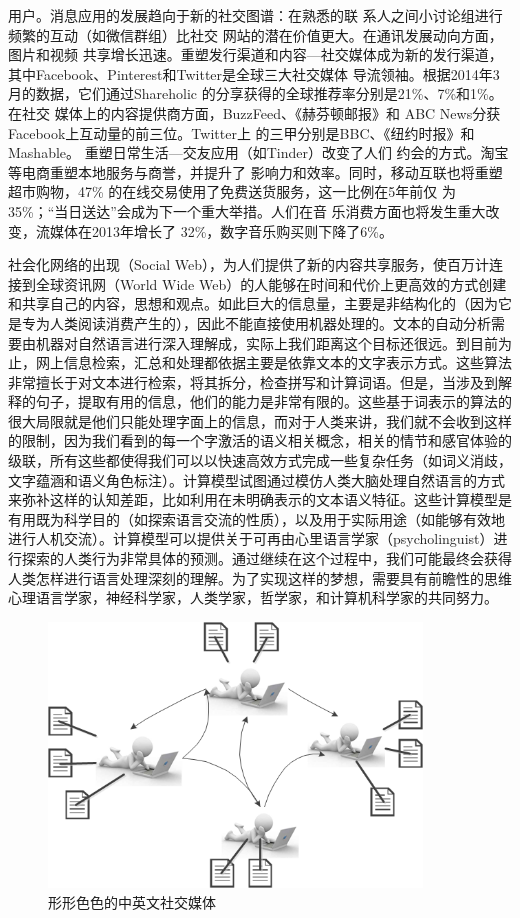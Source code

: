 用户。消息应用的发展趋向于新的社交图谱：在熟悉的联 系人之间小讨论组进行频繁的互动（如微信群组）比社交 网站的潜在价值更大。在通讯发展动向方面，图片和视频 共享增长迅速。重塑发行渠道和内容—社交媒体成为新的发行渠道，
其中Facebook、Pinterest和Twitter是全球三大社交媒体 导流领袖。根据2014年3月的数据，它们通过Shareholic 的分享获得的全球推荐率分别是21\%、7\%和1\%。在社交 媒体上的内容提供商方面，BuzzFeed、《赫芬顿邮报》和 ABC News分获Facebook上互动量的前三位。Twitter上 的三甲分别是BBC、《纽约时报》和Mashable。
重塑日常生活—交友应用（如Tinder）改变了人们
约会的方式。淘宝等电商重塑本地服务与商誉，并提升了 影响力和效率。同时，移动互联也将重塑超市购物，47\% 的在线交易使用了免费送货服务，这一比例在5年前仅 为35\%；“当日送达”会成为下一个重大举措。人们在音 乐消费方面也将发生重大改变，流媒体在2013年增长了 32\%，数字音乐购买则下降了6\%。

社会化网络的出现（Social Web），为人们提供了新的内容共享服务，使百万计连接到全球资讯网（World Wide Web）的人能够在时间和代价上更高效的方式创建和共享自己的内容，思想和观点。如此巨大的信息量，主要是非结构化的（因为它是专为人类阅读消费产生的），因此不能直接使用机器处理的。文本的自动分析需要由机器对自然语言进行深入理解成，实际上我们距离这个目标还很远。到目前为止，网上信息检索，汇总和处理都依据主要是依靠文本的文字表示方式。这些算法非常擅长于对文本进行检索，将其拆分，检查拼写和计算词语。但是，当涉及到解释的句子，提取有用的信息，他们的能力是非常有限的。这些基于词表示的算法的很大局限就是他们只能处理字面上的信息，而对于人类来讲，我们就不会收到这样的限制，因为我们看到的每一个字激活的语义相关概念，相关的情节和感官体验的级联，所有这些都使得我们可以以快速高效方式完成一些复杂任务（如词义消歧，文字蕴涵和语义角色标注）。计算模型试图通过模仿人类大脑处理自然语言的方式来弥补这样的认知差距，比如利用在未明确表示的文本语义特征。这些计算模型是有用既为科学目的（如探索语言交流的性质），以及用于实际用途（如能够有效地进行人机交流）。计算模型可以提供关于可再由心里语言学家（psycholinguist）进行探索的人类行为非常具体的预测。通过继续在这个过程中，我们可能最终会获得人类怎样进行语言处理深刻的理解。为了实现这样的梦想，需要具有前瞻性的思维心理语言学家，神经科学家，人类学家，哲学家，和计算机科学家的共同努力。
\begin{figure}[htp]
\centering
\includegraphics[height=200pt]{socialmedia.png}
\caption{形形色色的中英文社交媒体}
\label{socialmedia}
\end{figure}


